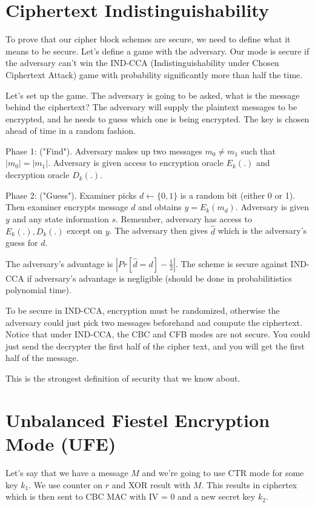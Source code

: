\documentclass[psamsfonts]{amsart}
\begin{document}
\section{Ciphertext Indistinguishability}

To prove that our cipher block schemes are secure, we need to define what it means to be secure. Let's define a game with the adversary. Our mode is secure if the adversary can't win the IND-CCA (Indistinguishability under Chosen Ciphertext Attack) game with probability significantly more than half the time.

Let's set up the game. The adversary is going to be asked, what is the message behind the ciphertext? The adversary will supply the plaintext messages to be encrypted, and he needs to guess which one is being encrypted. The key is chosen ahead of time in a random fashion.

Phase 1: ("Find"). Adversary makes up two messages $m_0 \neq m_1$ such that $|m_0| = |m_1|$. Adversary is given access to encryption oracle $E_k(.)$ and decryption oracle $D_k(.)$.

Phase 2: ("Guess"). Examiner picks $d \leftarrow \{0, 1\}$ is a random bit (either 0 or 1). Then examiner encrypts message $d$ and obtains $y = E_k (m_d)$. Adversary is given $y$ and any state information $s$. Remember, adversary has access to $E_k(.), D_k(.)$ except on $y$. The adversary then gives $\hat{d}$ which is the adversary's guess for $d$.

The adversary's advantage is $|Pr[\hat{d} = d] - \frac{1}{2} |$. The scheme is secure against IND-CCA if adversary's advantage is negligible (should be done in probabilitistics polynomial time).

To be secure in IND-CCA, encryption must be randomized, otherwise the adversary could just pick two messages beforehand and compute the ciphertext. Notice that under IND-CCA, the CBC and CFB modes are not secure. You could just send the decrypter the first half of the cipher text, and you will get the first half of the message.

This is the strongest definition of security that we know about.

\section{Unbalanced Fiestel Encryption Mode (UFE)}

Let's say that we have a message $M$ and we're going to use CTR mode for some key $k_1$. We use counter on $r$ and XOR result with $M$. This results in ciphertex which is then sent to CBC MAC with IV = 0 and a new secret key $k_2$.
\end{document}
